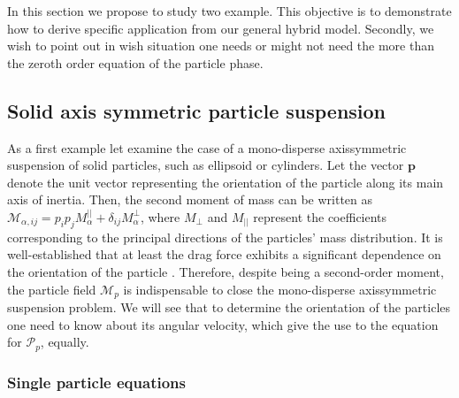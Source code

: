In this section we propose to study two example. 
This objective is to demonstrate how to derive specific application from our general hybrid model. 
Secondly, we wish to point out in wish situation one needs or might not need the more than the zeroth order equation of the particle phase.

\subsection{Solid axis symmetric particle suspension}

As a first example let examine the case of a mono-disperse axissymmetric suspension of solid particles, such as ellipsoid or cylinders.
Let the vector $\textbf{p}$ denote the unit vector representing the orientation of the particle along its main axis of inertia. 
Then, the second moment of mass can be written as $\mathcal{M}_{\alpha,ij} =  p_ip_j M_\alpha^{||} +  \delta_{ij} M_\alpha^\bot$, where $M_{\bot}$ and $M_{||}$ represent the coefficients corresponding to the principal directions of the particles' mass distribution.
It is well-established that at least the drag force exhibits a significant dependence on the orientation of the particle \citep{kim2013microhydrodynamics}.
Therefore, despite being a second-order moment, the particle field $\mathcal{M}_p$ is indispensable to close the mono-disperse axissymmetric suspension problem.
We will see that to determine the orientation of the particles one need to know about its angular velocity, which give the use to the equation for $\mathcal{P}_p$, equally.  


\subsubsection{Single particle equations}

